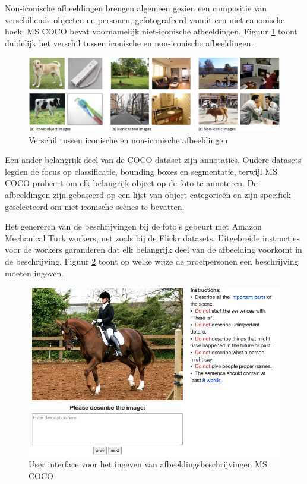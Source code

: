 Non-iconische afbeeldingen brengen algemeen gezien een compositie van verschillende objecten en personen, gefotografeerd vanuit een niet-canonische hoek. MS COCO bevat voornamelijk niet-iconische afbeeldingen. Figuur \ref{fig:cocotypes} toont duidelijk het verschil tussen iconische en non-iconische afbeeldingen.

\begin{figure}[tb]
    \centering
    \includegraphics[width=\linewidth]{Images/iconic.jpg}
    \caption{Verschil tussen iconische en non-iconische afbeeldingen}
    \label{fig:cocotypes}
\end{figure}

Een ander belangrijk deel van de COCO dataset zijn annotaties. Oudere datasets legden de focus op classificatie, bounding boxes en segmentatie, terwijl MS COCO probeert om elk belangrijk object op de foto te annoteren. De afbeeldingen zijn gebaseerd op een lijst van object categorie\"en en zijn specifiek geselecteerd om niet-iconische sc\`enes te bevatten.

Het genereren van de beschrijvingen bij de foto's gebeurt met Amazon Mechanical Turk workers, net zoals bij de Flickr datasets. Uitgebreide instructies voor de workers garanderen dat elk belangrijk deel van de afbeelding voorkomt in de beschrijving.\cite{Rampf2015} Figuur \ref{fig:coco_ui} toont op welke wijze de proefpersonen een beschrijving moeten ingeven.


\begin{figure}[tb]
    \centering
    \includegraphics[width=0.8\linewidth]{Images/coco_UI.png}
    \caption{User interface voor het ingeven van afbeeldingsbeschrijvingen MS COCO}
    \label{fig:coco_ui}
\end{figure}

